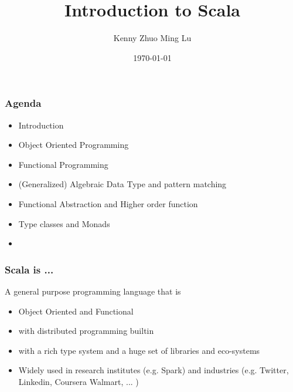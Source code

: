 \documentclass{beamer}
\begin{document}
\title{Introduction to Scala} 
\author{
 Kenny Zhuo Ming Lu
}
\date{\today} 


\frame{\titlepage} 

%
\begin{frame}[fragile]
\frametitle{Agenda}
\begin{itemize}
 \item Introduction
 \item Object Oriented Programming 
 \item Functional Programming 
 \item (Generalized) Algebraic Data Type and pattern matching
 \item Functional Abstraction and Higher order function
 \item Type classes and Monads
 \item 
\end{itemize}
\end{frame}

\begin{frame}[fragile]
\frametitle{Scala is ... }

A general purpose programming language that is 
\begin{itemize}
 \item Object Oriented and Functional
 \item with distributed programming builtin
 \item with a rich type system and a huge set of libraries and eco-systems
 \item Widely used in research institutes (e.g. Spark) and industries
   (e.g. Twitter, Linkedin, Coursera Walmart, ... )
\end{itemize}
\end{frame}
\end{document}
